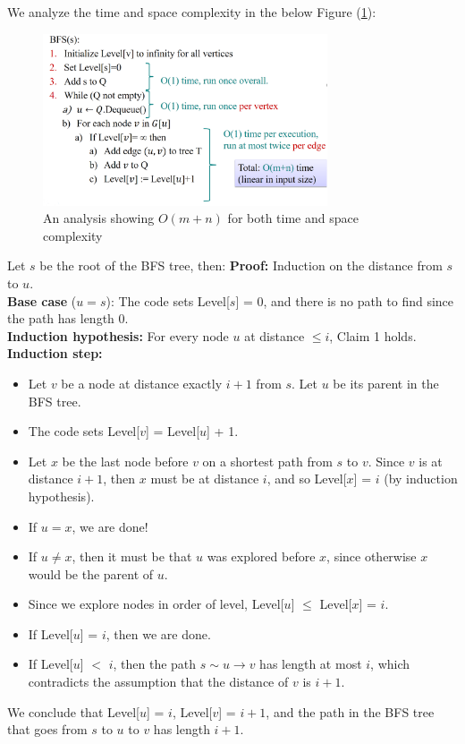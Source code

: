   \newpage

We analyze the time and space complexity in the below Figure (\ref{fig:bfs_q_ana}):

\begin{figure}[h]
    \begin{center}
      \includegraphics[height=2in]{./Sections/graphs/bfs_q_ana.png}
    \end{center}
     \caption{An analysis showing $O(m+n)$ for both time and space complexity}\label{fig:bfs_q_ana}
  \end{figure}
  \begin{Proof}
    Let $s$ be the root of the BFS tree, then:
    \textbf{Proof:} Induction on the distance from $s$ to $u$.\\
    \textbf{Base case} ($u = s$): The code sets Level[$s$] = 0, and there is no path to find since the path has length 0.\\
    \textbf{Induction hypothesis:} For every node $u$ at distance $\leq i$, Claim 1 holds.\\
    \textbf{Induction step:}
    \begin{itemize}
        \item Let $v$ be a node at distance exactly $i + 1$ from $s$. Let $u$ be its parent in the BFS tree.
        \item The code sets Level[$v$] = Level[$u$] + 1.
        \item Let $x$ be the last node before $v$ on a shortest path from $s$ to $v$. Since $v$ is at distance $i + 1$, then $x$ must be at distance $i$, and so Level[$x$] = $i$ (by induction hypothesis).
        \item If $u = x$, we are done!
        \item If $u \neq x$, then it must be that $u$ was explored before $x$, since otherwise $x$ would be the parent of $u$.
        \item Since we explore nodes in order of level, Level[$u$] $\leq$ Level[$x$] = $i$.
        \item If Level[$u$] = $i$, then we are done.
        \item If Level[$u$] $<$ $i$, then the path $s \sim u \to v$ has length at most $i$, which contradicts the assumption that the distance of $v$ is $i + 1$.
    \end{itemize}
    
    \noindent
    We conclude that Level[$u$] = $i$, Level[$v$] = $i + 1$, and the path in the BFS tree that goes from $s$ to $u$ to $v$ has length $i + 1$.
    \end{Proof}
    
